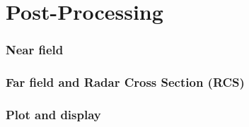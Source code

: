 \section{Post-Processing}



\subsubsection{Near field}
\subsubsection{Far field and Radar Cross Section (RCS)}
\subsubsection{Plot and display}

